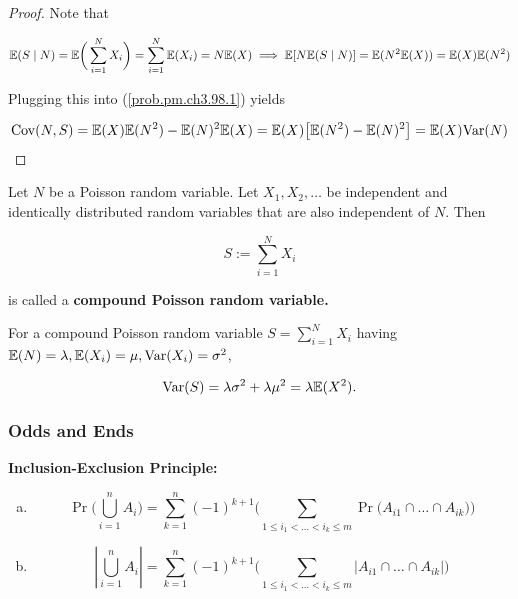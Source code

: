 \begin{theorem}
\begin{proof}
Note that 

\[
\E(S \mid N) = \E \bigg( \sum_{i=1}^N X_i \bigg) = \sum_{i=1}^N \E(X_i) = N \E(X) \implies \E[ N\E(S \mid N)] = \E(N^2 \E(X)) = \E(X) \E(N^2)
\]

Plugging this into (\ref{prob.pm.ch3.98.1}) yields

\[
\Cov(N, S) =  \E(X) \E(N^2)- \E(N)^2 \E(X)  = \E(X) \big[ \E(N^2) - \E(N)^2 \big] =  \E(X) \Var(N)
\]

\end{proof}

\begin{definition}Let \(N\) be a Poisson random variable. Let \(X_1, X_2, \ldots \) be independent and identically distributed random variables that are also independent of \(N\). Then

\[
S := \sum_{i=1}^N X_i
\]

is called a \textbf{compound Poisson random variable.}
\end{definition}

\begin{proposition}For a compound Poisson random variable \(S = \sum_{i=1}^N X_i\) having \(\E(N) = \lambda, \E(X_i) = \mu, \Var(X_i) = \sigma^2\), 

\[
\Var(S) = \lambda \sigma^2 + \lambda \mu^2 = \lambda \E(X^2).
\]

\end{proposition}

\subsubsection{Odds and Ends}

\begin{proposition} \label{prob.inex} \textbf{Inclusion-Exclusion Principle:}
\begin{enumerate}[(a)]

\item \[
\Pr \bigg( \bigcup_{i=1}^n A_i \bigg) = \sum_{k=1}^n (-1)^{k+1} \bigg( \sum_{1 \leq i_1 < \ldots < i_k \leq m} \Pr \big(A_{i1} \cap \ldots \cap A_{ik} \big) \bigg)
\]

\item \[
\left| \bigcup_{i=1}^n A_i \right| = \sum_{k=1}^n (-1)^{k+1} \bigg( \sum_{1 \leq i_1 < \ldots < i_k \leq m} \left| A_{i1} \cap \ldots \cap A_{ik} \right| \bigg)
\]
\end{enumerate}


\end{proposition}
\end{theorem}
